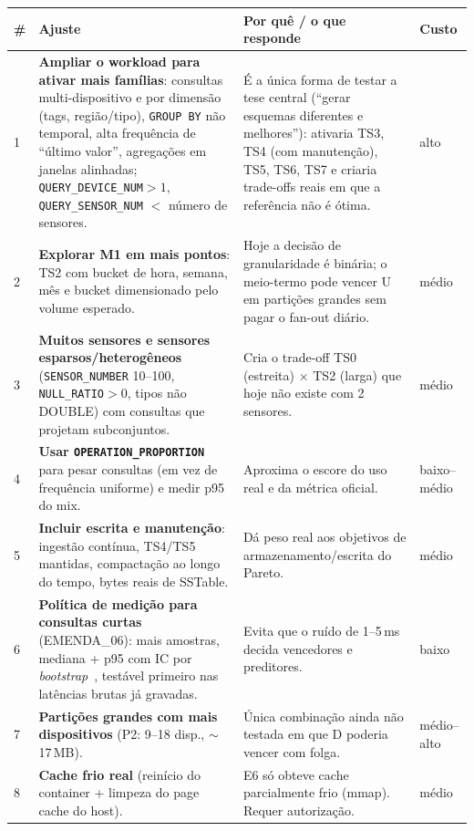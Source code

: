 \documentclass[11pt,a4paper]{article}
\begin{document}
\begin{longtable}{@{}p{0.4cm}p{5.2cm}p{6.3cm}p{1.8cm}@{}}
\toprule
\# & \textbf{Ajuste} & \textbf{Por quê / o que responde} & \textbf{Custo}\\\midrule\endhead
1 & \textbf{Ampliar o workload para ativar mais famílias}: consultas multi-dispositivo e por dimensão (tags, região/tipo), \texttt{GROUP BY} não temporal, alta frequência de ``último valor'', agregações em janelas alinhadas; \texttt{QUERY\_DEVICE\_NUM}$>1$, \texttt{QUERY\_SENSOR\_NUM} $<$ número de sensores. & É a única forma de testar a tese central (``gerar esquemas diferentes e melhores''): ativaria TS3, TS4 (com manutenção), TS5, TS6, TS7 e criaria trade-offs reais em que a referência não é ótima. & alto\\
2 & \textbf{Explorar M1 em mais pontos}: TS2 com bucket de hora, semana, mês e bucket dimensionado pelo volume esperado. & Hoje a decisão de granularidade é binária; o meio-termo pode vencer U em partições grandes sem pagar o fan-out diário. & médio\\
3 & \textbf{Muitos sensores e sensores esparsos/heterogêneos} (\texttt{SENSOR\_NUMBER} 10--100, \texttt{NULL\_RATIO}$>0$, tipos não DOUBLE) com consultas que projetam subconjuntos. & Cria o trade-off TS0 (estreita) $\times$ TS2 (larga) que hoje não existe com 2 sensores. & médio\\
4 & \textbf{Usar \texttt{OPERATION\_PROPORTION}} para pesar consultas (em vez de frequência uniforme) e medir p95 do mix. & Aproxima o escore do uso real e da métrica oficial. & baixo--médio\\
5 & \textbf{Incluir escrita e manutenção}: ingestão contínua, TS4/TS5 mantidas, compactação ao longo do tempo, bytes reais de SSTable. & Dá peso real aos objetivos de armazenamento/escrita do Pareto. & médio\\
6 & \textbf{Política de medição para consultas curtas} (EMENDA\_06): mais amostras, mediana + p95 com IC por \emph{bootstrap}~\cite{efron}, testável primeiro nas latências brutas já gravadas. & Evita que o ruído de 1--5\,ms decida vencedores e preditores. & baixo\\
7 & \textbf{Partições grandes com mais dispositivos} (P2: 9--18 disp., $\sim$17\,MB). & Única combinação ainda não testada em que D poderia vencer com folga. & médio--alto\\
8 & \textbf{Cache frio real} (reinício do container + limpeza do page cache do host). & E6 só obteve cache parcialmente frio (mmap). Requer autorização. & médio\\

\end{longtable}
\end{document}
